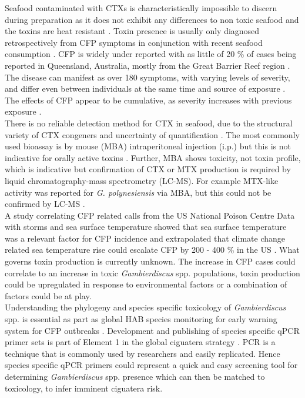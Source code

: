 \documentclass[12pt]{article}
\begin{document}
Seafood contaminated with CTXs is characteristically impossible to discern during preparation as it does not exhibit any differences to non toxic seafood and the toxins are heat resistant \cite{withers1982ciguatera}. Toxin presence is usually only diagnosed retrospectively from CFP symptoms in conjunction with recent seafood consumption \cite{sims1987theoretical}. CFP is widely under reported with as little of 20 \% of cases being reported  in Queensland, Australia, mostly from the Great Barrier Reef region \cite{lewis2006ciguatera}. The disease can manifest as over 180 symptoms, with varying levels of severity, and differ even between individuals at the same time and source of exposure \cite{sims1987theoretical}. The effects of CFP appear to be cumulative, as severity increases with previous exposure \cite{emerson1983preliminary}.  \\
There is no reliable detection method for CTX in seafood, due to the structural variety of CTX congeners and uncertainty of quantification \cite{dickey2010ciguatera}. The most commonly used bioassay is by mouse (MBA) intraperitoneal injection (i.p.) but this is not indicative for orally active toxins \cite{botana2014seafood}. Further, MBA shows toxicity, not toxin profile, which is indicative but confirmation of CTX or MTX production is required by liquid chromatography-mass spectrometry (LC-MS). For example MTX-like activity was reported for \emph{G. polynesiensis} via MBA, but this could not be confirmed by LC-MS \cite{chinain1999morphology,rhodes2014production}. \\

A study correlating CFP related calls from the US National Poison Centre Data with storms and sea surface temperature showed that sea surface temperature was a relevant factor for CFP incidence and extrapolated that climate change related sea temperature rise could escalate CFP by 200 - 400 \% in the US \cite{garces2012habitat}. What governs toxin production is currently unknown. The increase in CFP cases could correlate to an increase in toxic \emph{Gambierdiscus} spp. populations, toxin production could be upregulated in response to environmental factors or a combination of factors could be at play.\\ %

Understanding the phylogeny and species specific toxicology of \emph{Gambierdiscus} spp. is essential as part as global HAB species monitoring for early warning system for CFP outbreaks \cite{berdalet2012global}. Development and publishing of species specific qPCR primer sets is part of Element 1 in the global ciguatera strategy \cite{globalcig}. PCR is a technique that is commonly used by researchers and easily replicated. Hence species specific qPCR primers could represent a quick and easy screening tool for determining \emph{Gambierdiscus} spp. presence which can then be matched to toxicology, to infer imminent ciguatera risk.
\end{document}

